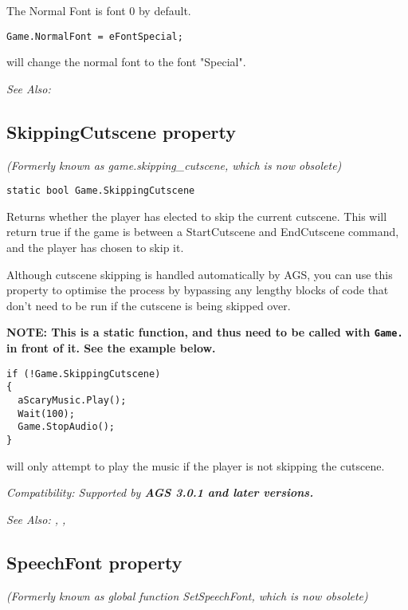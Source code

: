The Normal Font is font 0 by default.

\begin{verbatim}
Game.NormalFont = eFontSpecial;
\end{verbatim}
will change the normal font to the font "Special".

\it{See Also:} 


\subsection{SkippingCutscene property}\label{Game.SkippingCutscene}%

\it{(Formerly known as game.skipping_cutscene, which is now obsolete)}

\begin{verbatim}
static bool Game.SkippingCutscene
\end{verbatim}
Returns whether the player has elected to skip the current cutscene. This will return true
if the game is between a StartCutscene and EndCutscene command, and the player has chosen to
skip it.

Although cutscene skipping is handled automatically by AGS, you can use this property to optimise
the process by bypassing any lengthy blocks of code that don't need to be run if the cutscene is
being skipped over.

\bf{NOTE:} This is a static function, and thus need to be called with \verb$Game.$ in front of it. See
the example below.

\begin{verbatim}
if (!Game.SkippingCutscene)
{
  aScaryMusic.Play();
  Wait(100);
  Game.StopAudio();
}
\end{verbatim}
will only attempt to play the music if the player is not skipping the cutscene.

\it{Compatibility:} Supported by \bf{AGS 3.0.1} and later versions.

\it{See Also:} , ,


\subsection{SpeechFont property}\label{Game.SpeechFont}%

\it{(Formerly known as global function SetSpeechFont, which is now obsolete)}


